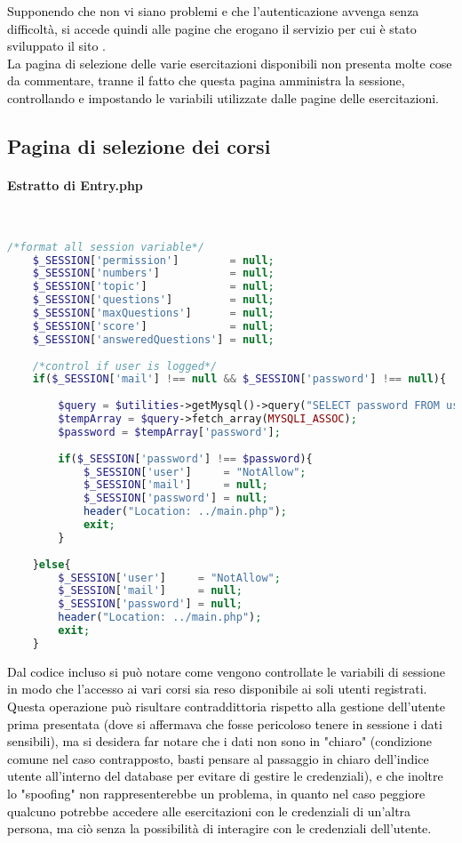 \textcolor{black}{Supponendo che non vi siano problemi e che l'autenticazione avvenga senza difficoltà, si accede quindi alle pagine che erogano il servizio per cui è stato sviluppato il sito .\\
La pagina di selezione delle varie esercitazioni disponibili non presenta molte cose da commentare, tranne il fatto che questa pagina amministra la sessione, controllando e impostando le variabili utilizzate dalle pagine delle esercitazioni.}

\subsection{Pagina di selezione dei corsi}

\paragraph{Estratto di Entry.php}\leavevmode\\

\begin{lstlisting}[language=php]
	/*format all session variable*/
	$_SESSION['permission']        = null;
	$_SESSION['numbers']           = null;
	$_SESSION['topic']             = null;
	$_SESSION['questions']         = null;
	$_SESSION['maxQuestions']      = null;
	$_SESSION['score']             = null;
	$_SESSION['answeredQuestions'] = null;
	
	/*control if user is logged*/
	if($_SESSION['mail'] !== null && $_SESSION['password'] !== null){
		
		$query = $utilities->getMysql()->query("SELECT password FROM user_table1 WHERE (email = '{$_SESSION['mail']}')");
		$tempArray = $query->fetch_array(MYSQLI_ASSOC);
		$password = $tempArray['password'];
		
		if($_SESSION['password'] !== $password){
			$_SESSION['user']     = "NotAllow";
			$_SESSION['mail']     = null;
			$_SESSION['password'] = null;
			header("Location: ../main.php");
			exit;
		}
		
	}else{
		$_SESSION['user']     = "NotAllow";
		$_SESSION['mail']     = null;
		$_SESSION['password'] = null;
		header("Location: ../main.php");
		exit;
	}
\end{lstlisting}

\textcolor{black}{Dal codice incluso si può notare come vengono controllate le variabili di sessione in modo che l'accesso ai vari corsi sia reso disponibile ai soli utenti registrati. Questa operazione può risultare contraddittoria rispetto alla gestione dell'utente prima presentata (dove si affermava che fosse pericoloso tenere in sessione i dati sensibili), ma si desidera far notare che i dati non sono in "chiaro" (condizione comune nel caso contrapposto, basti pensare al passaggio in chiaro dell'indice utente all'interno del database per evitare di gestire le credenziali), e che inoltre lo "spoofing" non rappresenterebbe un problema, in quanto nel caso peggiore qualcuno potrebbe accedere alle esercitazioni con le  credenziali di un'altra persona, ma ciò senza la possibilità di interagire con le credenziali dell'utente.}\\


